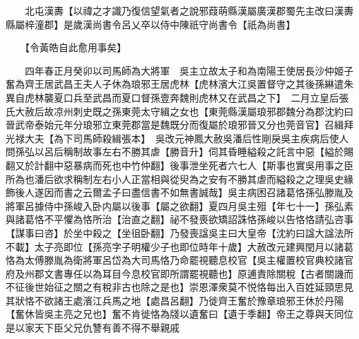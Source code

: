 　　北屯漢夀【以禕之才識乃復信望氣者之說邪葭萌縣漢屬廣漢郡蜀先主改曰漢夀縣屬梓潼郡】是歲漢尚書令呂乂卒以侍中陳祇守尚書令【祇為尚書】

　　【令黃皓自此愈用事矣】

　　四年春正月癸卯以司馬師為大將軍　吳主立故太子和為南陽王使居長沙仲姬子奮為齊王居武昌王夫人子休為琅邪王居虎林【虎林濱大江吳置督守之其後孫綝遣朱異自虎林襲夏口兵至武昌而夏口督孫壹奔魏則虎林又在武昌之下】　二月立皇后張氏大赦后故凉州刺史既之孫東莞太守緝之女也【東莞縣漢屬琅邪郡魏分為郡沈約曰晉武帝泰始元年分琅邪立東莞郡當是魏既分而復屬於琅邪晉又分也莞音官】召緝拜光禄大夫【為下司馬師殺緝張本】　吳改元神鳳大赦吳潘后性剛戾吳主疾病后使人問孫弘以呂后稱制故事左右不勝其虐【勝音升】伺其昏睡縊殺之託言中惡【縊於賜翻又於計翻中惡暴病而死也中竹仲翻】後事泄坐死者六七人【斯事也實吳用事之臣所為也潘后欲求稱制左右小人正當相與從臾為之安有不勝其虐而縊殺之之理吳史緣飾後人遂因而書之云爾孟子曰盡信書不如無書誠哉】吳主病困召諸葛恪孫弘滕胤及將軍呂據侍中孫峻入卧内屬以後事【屬之欲翻】夏四月吳主殂【年七十一】孫弘素與諸葛恪不平懼為恪所治【治直之翻】祕不發喪欲矯詔誅恪孫峻以告恪恪請弘咨事【謀事曰咨】於坐中殺之【坐徂卧翻】乃發喪諡吳主曰大皇帝【沈約曰諡大諡法所不載】太子亮即位【孫亮字子明權少子也即位時年十歲】大赦改元建興閏月以諸葛恪為太傅滕胤為衛將軍呂岱為大司馬恪乃命罷視聽息校官【吳主權置校官典校諸官府及州郡文書專任以為耳目今息校官即所謂罷視聽也】原逋責除關稅【古者關譏而不征後世始征之關之有稅非古也除之是也】崇恩澤衆莫不悦恪每出入百姓延頸思見其狀恪不欲諸王處濱江兵馬之地【處昌呂翻】乃徙齊王奮於豫章琅邪王休於丹陽【奮休皆吳主亮之兄也】奮不肯徙恪為牋以遺奮曰【遺于季翻】帝王之尊與天同位是以家天下臣父兄仇讐有善不得不舉親戚